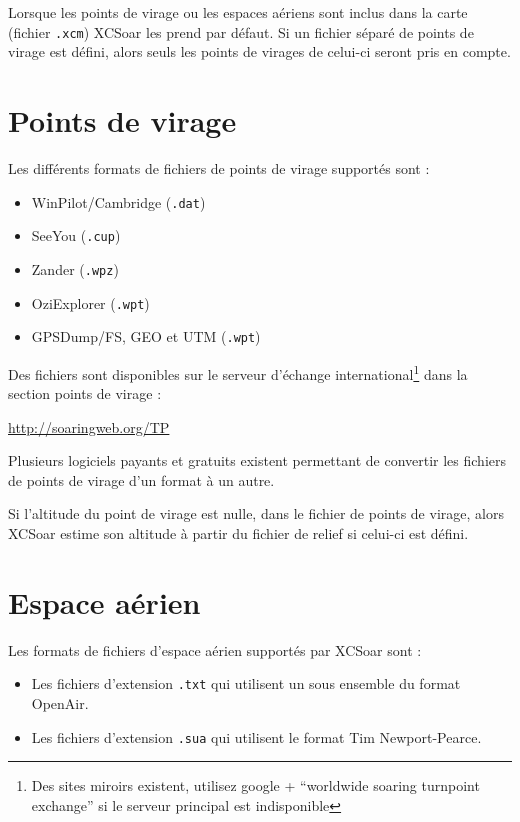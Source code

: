 Lorsque les points de virage ou les espaces aériens sont inclus dans la carte (fichier \verb|.xcm|) XCSoar les prend par défaut. Si un fichier séparé de points de virage est défini, alors seuls les points de virages de celui-ci seront pris en compte.

\section{Points de virage}

Les différents formats de fichiers de points de virage supportés sont :

\begin{itemize}
\item WinPilot/Cambridge (\verb|.dat|)
\item SeeYou (\verb|.cup|)
\item Zander (\verb|.wpz|)
\item OziExplorer (\verb|.wpt|)
\item GPSDump/FS, GEO et UTM (\verb|.wpt|)
\end{itemize}

Des fichiers sont disponibles sur le serveur d'échange international\footnote{Des sites miroirs existent, utilisez google + ``worldwide soaring turnpoint exchange'' si le serveur principal est indisponible} dans la section points de virage : 

{\href{http://soaringweb.org/TP/}{http://soaringweb.org/TP}}

Plusieurs logiciels payants et gratuits existent permettant de convertir les fichiers de points de virage d'un format à un autre. 

Si l'altitude du point de virage est nulle, dans le fichier de points de virage, alors XCSoar estime son altitude à partir du fichier de relief si celui-ci est défini.


\section{Espace aérien}

Les formats de fichiers d'espace aérien supportés par XCSoar sont :
\begin{itemize}
\item Les fichiers d'extension \verb|.txt| qui utilisent un sous ensemble du format OpenAir.
\item Les fichiers d'extension \verb|.sua| qui utilisent le format Tim Newport-Pearce.
\end{itemize}

